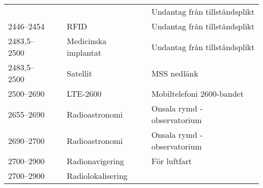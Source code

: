 \begin{landscape}
\begin{longtable}{llll}
	                   &                    &                         & Undantag från tillståndsplikt            \\
	2446--2454         &                    & RFID                    & Undantag från tillståndsplikt            \\
	2483,5--2500       &                    & Medicinska implantat    & Undantag från tillståndsplikt            \\
	2483,5--2500       &                    & Satellit                & MSS nedlänk                              \\
	2500--2690         &                    & LTE-2600                & Mobiltelefoni 2600-bandet                \\
	2655--2690         &                    & Radioastronomi          & Onsala rymd - observatorium              \\
	2690--2700         &                    & Radioastronomi          & Onsala rymd - observatorium              \\
	2700--2900         &                    & Radionavigering         & För luftfart                             \\
	2700--2900         &                    & Radiolokalisering       &
\end{longtable}
\end{landscape}




